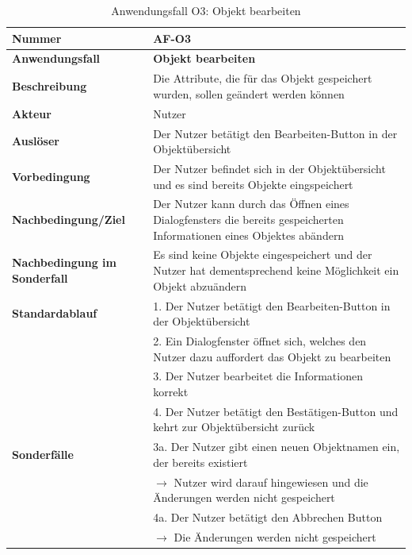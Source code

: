 \documentclass[oneside]{ausarbeitung}
\begin{document}
\begin{table}[htbp]
	\centering
	\begin{tabular}{|l|p{80mm}|}
		\hline
		\textbf{Nummer} & \textbf{AF-O3} \\ \hline
		\textbf{Anwendungsfall} & \textbf{Objekt bearbeiten} \\ \hline
		\textbf{Beschreibung} & Die Attribute, die für das Objekt gespeichert wurden, sollen geändert werden können \\ \hline
		\textbf{Akteur} & Nutzer \\ \hline
		\textbf{Auslöser} & Der Nutzer betätigt den \glqq Bearbeiten\grqq-Button in der Objektübersicht \\ \hline
		\textbf{Vorbedingung} & Der Nutzer befindet sich in der Objektübersicht und es sind bereits Objekte eingspeichert \\ \hline	
		\textbf{Nachbedingung/Ziel} & Der Nutzer kann durch das Öffnen eines Dialogfensters die bereits gespeicherten Informationen eines Objektes abändern \\ \hline
		\textbf{Nachbedingung im Sonderfall} & Es sind keine Objekte eingespeichert und der Nutzer hat dementsprechend keine Möglichkeit ein Objekt abzuändern \\ \hline
		\textbf{Standardablauf} & 1. Der Nutzer betätigt den \glqq Bearbeiten\grqq-Button in der Objektübersicht \\
		& 2. Ein Dialogfenster öffnet sich, welches den Nutzer dazu auffordert das Objekt zu bearbeiten \\
		& 3. Der Nutzer bearbeitet die Informationen korrekt \\
		& 4. Der Nutzer betätigt den \glqq Bestätigen\grqq -Button und kehrt zur Objektübersicht zurück \\ \hline
		\textbf{Sonderfälle} & 3a. Der Nutzer gibt einen neuen Objektnamen ein, der bereits existiert \\ & $\rightarrow$ Nutzer wird darauf hingewiesen und die Änderungen werden nicht gespeichert \\
		& 4a. Der Nutzer betätigt den Abbrechen Button \\ & $\rightarrow$ Die Änderungen werden nicht gespeichert \\ \hline
		
	\end{tabular}
	\caption{Anwendungsfall O3: Objekt bearbeiten}
	\label{tab:use-case-edit-object}	
\end{table}
\end{document}
